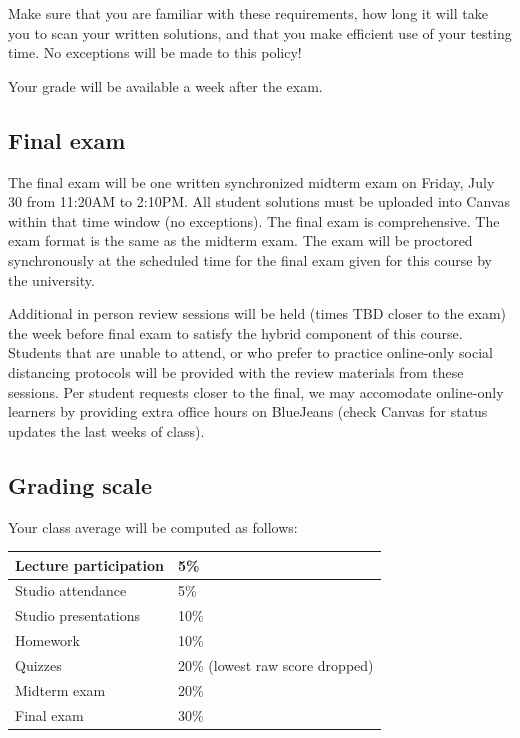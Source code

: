 \documentclass[11pt]{article}
\begin{document}
     Make sure that you are familiar with these 
    requirements, how long it will take you to scan your written solutions, and that you make efficient use 
    of your testing time. No exceptions will be made to this policy!
    
    Your grade will be available a week after the exam. 
    
   
       \subsection{Final exam}
        
        The final exam will be one written synchronized midterm exam on Friday, July 30 from 
        11:20AM to 2:10PM. All student solutions must be uploaded into Canvas within that time window 
        (no exceptions). The final exam is comprehensive. 
        The exam format is the same as the midterm exam. 
        The exam will be proctored synchronously at the scheduled time for the 
        final exam given for this course by the university. 

        Additional in person review sessions will be held (times TBD closer to the exam) the week before final exam to 
        satisfy the hybrid component of this course. Students that are unable to attend, or who prefer to 
        practice online-only social distancing protocols will be provided with the review materials 
        from these sessions. Per student requests closer to the final, we may accomodate online-only learners 
        by providing extra office hours on BlueJeans (check Canvas for status updates the last weeks of class).        

        \subsection{Grading scale}
        
        Your class average will be computed as follows:
        
        \begin{table}[h!]
        \centering
        \begin{tabular}{|l|l|}
        \hline
            Lecture participation & 5\%  \\
            \hline
            Studio attendance & 5\%\\
            \hline
            Studio presentations & 10\%\\
            \hline
            Homework & 10\%\\
            \hline
             Quizzes & 20\% (lowest raw score dropped)\\ \hline
            Midterm exam & 20\%\\
            \hline
            Final exam & 30\%\\
            \hline
        \end{tabular}
        \end{table}
        
\end{document}
